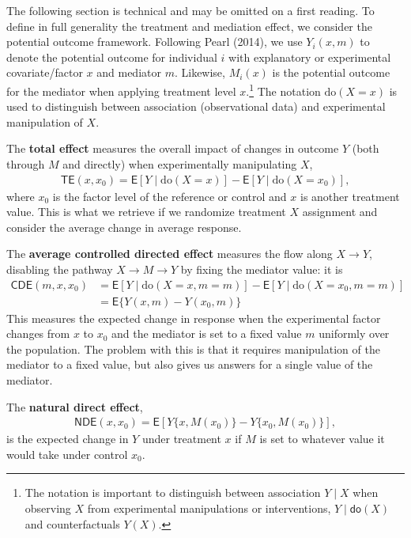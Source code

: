 \documentclass[
  11pt,
  letterpaper,
]{scrbook}
\theoremstyle{definition}
\theoremstyle{remark}
\begin{document}
The following section is technical and may be omitted on a first
reading. To define in full generality the treatment and mediation
effect, we consider the potential outcome framework. Following Pearl
(2014), we use \(Y_i(x, m)\) to denote the potential outcome for
individual \(i\) with explanatory or experimental covariate/factor \(x\)
and mediator \(m\). Likewise, \(M_i(x)\) is the potential outcome for
the mediator when applying treatment level \(x\).\footnote{The notation
  is important to distinguish between association \(Y \mid X\) when
  observing \(X\) from experimental manipulations or interventions,
  \(Y \mid \mathsf{do}(X)\) and counterfactuals \(Y(X)\).} The notation
\(\text{do}(X=x)\) is used to distinguish between association
(observational data) and experimental manipulation of \(X\).

The \textbf{total effect} measures the overall impact of changes in
outcome \(Y\) (both through \(M\) and directly) when experimentally
manipulating \(X\),
\begin{align*}\mathsf{TE}(x, x_0) = \mathsf{E}[ Y \mid \text{do}(X=x)] - \mathsf{E}[ Y \mid \text{do}(X=x_0)],
\end{align*} where \(x_0\) is the factor level of the reference or
control and \(x\) is another treatment value. This is what we retrieve
if we randomize treatment \(X\) assignment and consider the average
change in average response.

The \textbf{average controlled directed effect} measures the flow along
\(X \rightarrow Y\), disabling the pathway \(X \to M \to Y\) by fixing
the mediator value: it is \begin{align*}
\textsf{CDE}(m, x, x_0) &= 
\mathsf{E}[Y \mid \text{do}(X=x, m=m)] - \mathsf{E}[Y \mid \text{do}(X=x_0, m=m)] \\&= \mathsf{E}\{Y(x,m) -Y(x_0, m)\}
\end{align*} This measures the expected change in response when the
experimental factor changes from \(x\) to \(x_0\) and the mediator is
set to a fixed value \(m\) uniformly over the population. The problem
with this is that it requires manipulation of the mediator to a fixed
value, but also gives us answers for a single value of the mediator.

The \textbf{natural direct effect}, \begin{align*}
\textsf{NDE}(x, x_0) = \mathsf{E}[Y\{x, M(x_0)\} - Y\{x_0,  M(x_0)\}],
\end{align*} is the expected change in \(Y\) under treatment \(x\) if
\(M\) is set to whatever value it would take under control \(x_0\).
\end{document}
